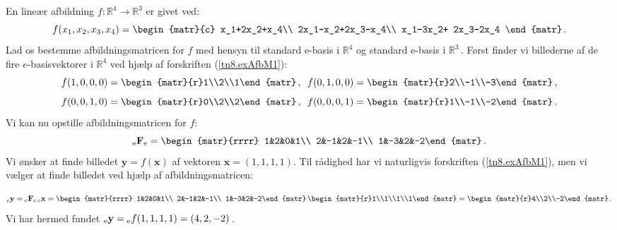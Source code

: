 \begin{example} \label{tn8.brugAfbM2}
En lineær afbildning $f: \mathbb R^4\rightarrow \mathbb R^3$ er givet ved:
\begin{equation}\label{tn8.exAfbM1}
f(x_1,x_2,x_3,x_4)
=\begin{matr}{c}
x_1+2x_2+x_4\\
2x_1-x_2+2x_3-x_4\\
x_1-3x_2+ 2x_3-2x_4
\end{matr}\,.
\end{equation}
Lad os bestemme afbildningsmatricen for $f$ med hensyn til standard e-basis i $\mathbb R^4$ og standard e-basis i $\mathbb R^3\,$. Først finder vi billederne af de fire $e$-basisvektorer i $\mathbb R^4$ ved hjælp af forskriften (\ref{tn8.exAfbM1}):
$$
f(1,0,0,0)=
 \begin{matr}{r}1\\2\\1\end{matr}\,,\,\,\,
f(0,1,0,0)= 
 \begin{matr}{r}2\\-1\\-3\end{matr}\,,$$
$$f(0,0,1,0)= 
  \begin{matr}{r}0\\2\\2\end{matr}\,,\,\,\,
f(0,0,0,1)=  
 \begin{matr}{r}1\\-1\\-2\end{matr}\,.
$$
Vi kan nu opstille afbildningsmatricen for $f$:
\begin{equation}
\matind eFe = \begin{matr}{rrrr}
1&2&0&1\\
2&-1&2&-1\\
1&-3&2&-2\end{matr}\,.
\end{equation}
Vi ønsker at finde billedet $\mathbf y=f(\mathbf x)$ af vektoren $\mathbf x=(1,1,1,1)$. Til rådighed har vi naturligvis forskriften (\ref{tn8.exAfbM1}), men vi vælger at finde billedet ved hjælp af afbildningsmatricen:

$$
\vekind ey=\matind eFe\,\vekind ex
=\begin{matr}{rrrr}
1&2&0&1\\
2&-1&2&-1\\
1&-3&2&-2\end{matr}\,
\begin{matr}{r}1\\1\\1\\1\end{matr}=
\begin{matr}{r}4\\2\\-2\end{matr}\,.
$$
Vi har hermed fundet ${_\mathrm{e}\mathbf{y}}= {_\mathrm e f}(1,1,1,1)=(4,2,-2)\,$.
\end{example}

